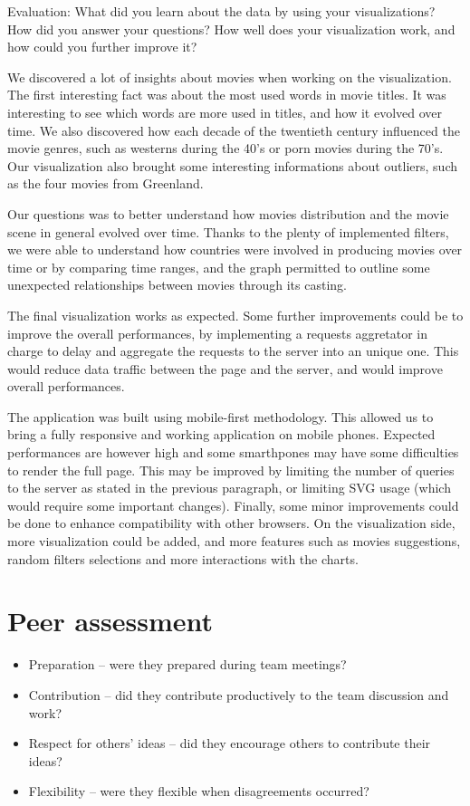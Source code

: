 \documentclass[a4paper,10pt]{article}
\begin{document}
Evaluation: What did you learn about the data by using your visualizations? How did you answer your questions? How well does your visualization work, and how could you further improve it?

We discovered a lot of insights about movies when working on the visualization. The
first interesting fact was about the most used words in movie titles. It was interesting
to see which words are more used in titles, and how it evolved over time. We also
discovered how each decade of the twentieth century influenced the movie genres,
such as westerns during the 40's or porn movies during the 70's. Our visualization
also brought some interesting informations about outliers, such as the four movies
from Greenland.

Our questions was to better understand how movies distribution and the movie scene
in general evolved over time. Thanks to the plenty of implemented filters, we were
able to understand how countries were involved in producing movies over time or by
comparing time ranges, and the graph permitted to outline some unexpected relationships
between movies through its casting.

The final visualization works as expected. Some further improvements could be to
improve the overall performances, by implementing a requests aggretator in charge
to delay and aggregate the requests to the server into an unique one. This would
reduce data traffic between the page and the server, and would improve overall performances.

The application was built using mobile-first methodology. This allowed us to bring
a fully responsive and working application on mobile phones. Expected performances
are however high and some smarthpones may have some difficulties to render the full
page. This may be improved by limiting the number of queries to the server as stated
in the previous paragraph, or limiting SVG usage (which would require some important changes).
Finally, some minor improvements could be done to enhance compatibility with other browsers.
On the visualization side, more visualization could be added, and more features such
as movies suggestions, random filters selections and more interactions with the charts.

\section{Peer assessment}

\begin{itemize}
  \item Preparation – were they prepared during team meetings?
  \item Contribution – did they contribute productively to the team discussion and work?
  \item Respect for others’ ideas – did they encourage others to contribute their ideas?
  \item Flexibility – were they flexible when disagreements occurred?
\end{itemize}

\setlength{\parskip}{0.1\baselineskip}

\newpage

\listoffigures
\end{document}
